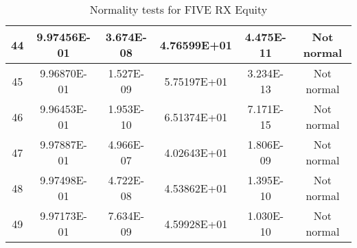 \begin{table}[h]
\begin{tabular}{|c|c|c|c|c|c|}
		44 & 9.97456E-01 & 3.674E-08 & 4.76599E+01 & 4.475E-11 & Not normal\\\hline
		45 & 9.96870E-01 & 1.527E-09 & 5.75197E+01 & 3.234E-13 & Not normal\\\hline
		46 & 9.96453E-01 & 1.953E-10 & 6.51374E+01 & 7.171E-15 & Not normal\\\hline
		47 & 9.97887E-01 & 4.966E-07 & 4.02643E+01 & 1.806E-09 & Not normal\\\hline
		48 & 9.97498E-01 & 4.722E-08 & 4.53862E+01 & 1.395E-10 & Not normal\\\hline
		49 & 9.97173E-01 & 7.634E-09 & 4.59928E+01 & 1.030E-10 & Not normal\\\hline
	\end{tabular}
	\caption{Normality tests for FIVE RX Equity}
	\label{tab:normality_tests_FIVE_RX}
\end{table}
